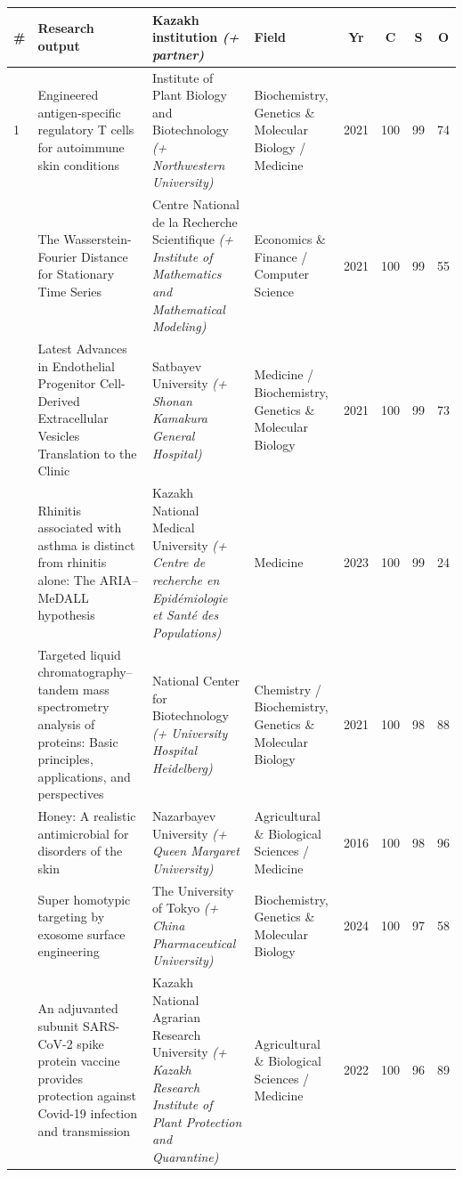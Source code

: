 \documentclass[10pt]{article}
\begin{document}
\vspace{6pt}
\footnotesize
\begin{longtable}{@{}p{0.4cm} p{4.4cm} p{3.5cm} p{2.5cm} c c c c@{}}
\toprule
\# & \textbf{Research output} & \textbf{Kazakh institution} \textit{(+ partner)} & \textbf{Field} & \textbf{Yr} & \textbf{C} & \textbf{S} & \textbf{O} \\
\midrule
\endhead
1 & Engineered antigen-specific regulatory T cells for autoimmune skin conditions & Institute of Plant Biology and Biotechnology \textit{(+ Northwestern University)} & Biochemistry, Genetics \& Molecular Biology / Medicine & 2021 & 100 & 99 & 74 \\
\addlinespace
2 & The Wasserstein-Fourier Distance for Stationary Time Series & Centre National de la Recherche Scientifique \textit{(+ Institute of Mathematics and Mathematical Modeling)} & Economics \& Finance / Computer Science & 2021 & 100 & 99 & 55 \\
\addlinespace
3 & Latest Advances in Endothelial Progenitor Cell-Derived Extracellular Vesicles Translation to the Clinic & Satbayev University \textit{(+ Shonan Kamakura General Hospital)} & Medicine / Biochemistry, Genetics \& Molecular Biology & 2021 & 100 & 99 & 73 \\
\addlinespace
4 & Rhinitis associated with asthma is distinct from rhinitis alone: The ARIA--MeDALL hypothesis & Kazakh National Medical University \textit{(+ Centre de recherche en Epidémiologie et Santé des Populations)} & Medicine & 2023 & 100 & 99 & 24 \\
\addlinespace
5 & Targeted liquid chromatography--tandem mass spectrometry analysis of proteins: Basic principles, applications, and perspectives & National Center for Biotechnology \textit{(+ University Hospital Heidelberg)} & Chemistry / Biochemistry, Genetics \& Molecular Biology & 2021 & 100 & 98 & 88 \\
\addlinespace
6 & Honey: A realistic antimicrobial for disorders of the skin & Nazarbayev University \textit{(+ Queen Margaret University)} & Agricultural \& Biological Sciences / Medicine & 2016 & 100 & 98 & 96 \\
\addlinespace
7 & Super homotypic targeting by exosome surface engineering & The University of Tokyo \textit{(+ China Pharmaceutical University)} & Biochemistry, Genetics \& Molecular Biology & 2024 & 100 & 97 & 58 \\
\addlinespace
8 & An adjuvanted subunit SARS-CoV-2 spike protein vaccine provides protection against Covid-19 infection and transmission & Kazakh National Agrarian Research University \textit{(+ Kazakh Research Institute of Plant Protection and Quarantine)} & Agricultural \& Biological Sciences / Medicine & 2022 & 100 & 96 & 89 \\

\end{longtable}
\end{document}
